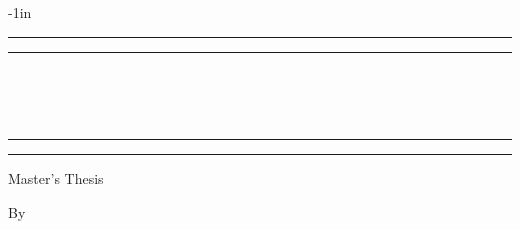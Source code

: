 
\begin{titlepage} %

\begin{adjustwidth*}{}{-1in}

	\centering %
	
	\scshape %
	
	\vspace*{\baselineskip} %
	
	
	\rule{\textwidth}{1.6pt}\vspace*{-\baselineskip}\vspace*{2pt} %
	\rule{\textwidth}{0.4pt} %
	
	\vspace{0.75\baselineskip} %
	
	{\LARGE \textsc{\titleen}\\\\\vspace{0.3cm}\titlede\\} %
	
	\vspace{0.75\baselineskip} %
	
	\rule{\textwidth}{0.4pt}\vspace*{-\baselineskip}\vspace{3.2pt} %
	\rule{\textwidth}{1.6pt} %
	
	\vspace{2\baselineskip} %
	
	Master's Thesis %
	
	\vspace*{3\baselineskip} %
	
	
	By
	
	\vspace{0.5\baselineskip} %
	

\end{adjustwidth*}
\end{titlepage}
